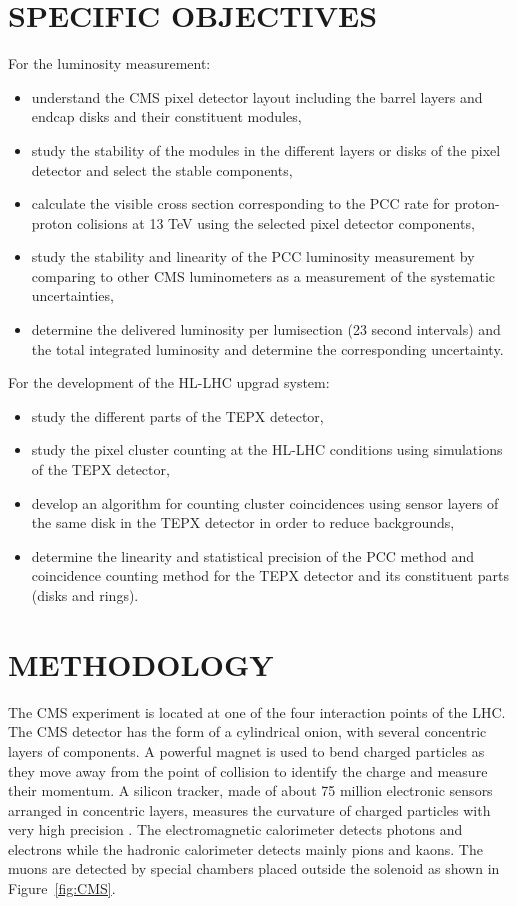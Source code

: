 \documentclass[final,12p]{article}
\begin{document}
\section{SPECIFIC OBJECTIVES}

For the luminosity measurement:
\begin{itemize}
\item understand the CMS pixel detector layout including the barrel layers and endcap disks and their constituent modules,
\item study the stability of the modules in the different layers or disks of the pixel detector and select the stable components,
\item calculate the visible cross section corresponding to the PCC rate for proton-proton colisions at 13 TeV using the selected pixel detector components,
\item study the stability and linearity of the PCC luminosity measurement by comparing to other CMS luminometers as a measurement of the systematic uncertainties,
\item determine the delivered luminosity per lumisection (23 second intervals) and the total integrated luminosity and determine the corresponding uncertainty.
\end{itemize}

\par
For the development of the HL-LHC upgrad system:
\begin{itemize}
\item study the different parts of the TEPX detector,
\item study the pixel cluster counting at the HL-LHC conditions using simulations of the TEPX detector,
\item develop an algorithm for counting cluster coincidences using sensor layers of the same disk in the TEPX detector in order to reduce backgrounds,
\item determine the linearity and statistical precision of the PCC method and coincidence counting method for the TEPX detector and its constituent parts (disks and rings).
\end{itemize}


\section{METHODOLOGY}


The CMS experiment is located at one of the four interaction points of the LHC.
The CMS detector has the form of a cylindrical onion, with several concentric layers of components.
A powerful magnet is used to bend charged particles as they move away from the point of collision to identify the charge and measure their momentum.
A silicon tracker, made of about 75 million electronic sensors arranged in concentric layers, measures the curvature of charged particles with very high precision \cite{Chatrchyan:2008aa}.
The electromagnetic calorimeter detects photons and electrons while the hadronic calorimeter detects mainly pions and kaons.
The muons are detected by special chambers placed outside the solenoid as shown in Figure~\ref{fig:CMS}.
\end{document}
